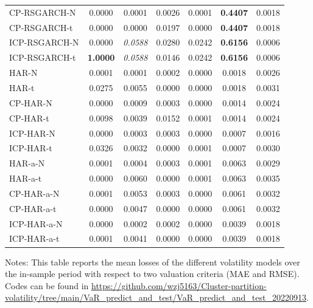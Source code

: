 \documentclass[preprint,12pt,authoryear]{elsarticle}
\begin{document}
\begin{center}
\begin{threeparttable}
\begin{tabular}{l c c c c c c}
CP-RSGARCH-N          & 0.0000   & 0.0001 & 0.0026 & 0.0001 & \textbf{0.4407} & 0.0018 \\
CP-RSGARCH-t          & 0.0000   & 0.0000 & 0.0197 & 0.0000 & \textbf{0.4407} & 0.0018 \\
ICP-RSGARCH-N         & 0.0000   & \textit{0.0588} & 0.0280 & 0.0242 & \textbf{0.6156} & 0.0006 \\
ICP-RSGARCH-t         & \textbf{1.0000}   & \textit{0.0588} & 0.0146 & 0.0242 & \textbf{0.6156} & 0.0006 \\
HAR-N                 & 0.0001   & 0.0001 & 0.0002 & 0.0000 & 0.0018 & 0.0026 \\
HAR-t                 & 0.0275   & 0.0055 & 0.0000 & 0.0000 & 0.0018 & 0.0031 \\
CP-HAR-N              & 0.0000   & 0.0009 & 0.0003 & 0.0000 & 0.0014 & 0.0024 \\
CP-HAR-t              & 0.0098   & 0.0039 & 0.0152 & 0.0001 & 0.0014 & 0.0024 \\
ICP-HAR-N             & 0.0000   & 0.0003 & 0.0003 & 0.0000 & 0.0007 & 0.0016 \\
ICP-HAR-t             & 0.0326   & 0.0032 & 0.0000 & 0.0001 & 0.0007 & 0.0030 \\
HAR-a-N               & 0.0001   & 0.0004 & 0.0003 & 0.0001 & 0.0063 & 0.0029 \\
HAR-a-t               & 0.0000   & 0.0060 & 0.0000 & 0.0001 & 0.0063 & 0.0035 \\
CP-HAR-a-N            & 0.0001   & 0.0053 & 0.0003 & 0.0000 & 0.0061 & 0.0032 \\
CP-HAR-a-t            & 0.0000   & 0.0047 & 0.0000 & 0.0000 & 0.0061 & 0.0032 \\
ICP-HAR-a-N           & 0.0000   & 0.0002 & 0.0002 & 0.0000 & 0.0039 & 0.0018 \\
ICP-HAR-a-t           & 0.0001   & 0.0041 & 0.0000 & 0.0000 & 0.0039 & 0.0018 \\
\bottomrule
\end{tabular}
Notes: This table reports the mean losses of the different volatility models over the in-sample period with respect to two valuation criteria (MAE and RMSE).
Codes can be found in \url{https://github.com/wzj5163/Cluster-partition-volatility/tree/main/VaR_predict_and_test/VaR_predict_and_test_20220913}.
\end{threeparttable}
\end{center}
\end{document}
